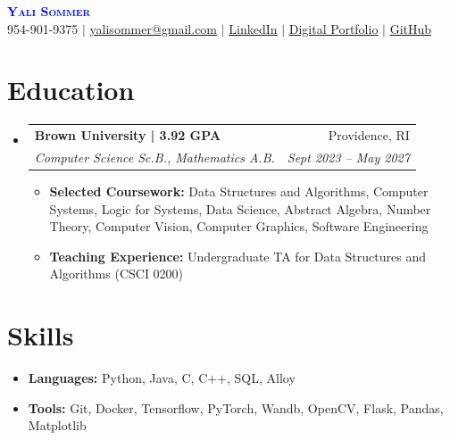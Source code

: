 \documentclass[letterpaper,11pt]{article}
\makeatletter
\newcommand{\resumeItem}[1]{
  \item\small{
    {#1 \vspace{-4pt}}
  }
}
\newcommand{\resumeSubheading}[4]{
  \vspace{-2pt}\item
    \begin{tabular*}{0.97\textwidth}[t]{l@{\extracolsep{\fill}}r}
      \textbf{#1} & #2 \\
      \textit{\small#3} & \textit{\small #4} \\
    \end{tabular*}\vspace{-7pt}
}
\newcommand{\resumeSubHeadingListStart}{\begin{itemize}[leftmargin=0.15in, label={}]}
\newcommand{\resumeSubHeadingListEnd}{\end{itemize}}
\makeatother
\begin{document}

\begin{center}
    \textbf{\Huge \scshape \textcolor{blue}{Yali Sommer}} \\ \vspace{1pt}
    \small 954-901-9375 $|$ \href{mailto:yalisommer@gmail.com}{\underline{yalisommer@gmail.com}} $|$ 
    \href{https://www.linkedin.com/in/yalisommer/}{\underline{LinkedIn}} $|$
    \href{https://yalisommer.github.io/portfolio/#/}{\underline{Digital Portfolio}} $|$
    \href{https://github.com/yalisommer}
    {\underline{GitHub}} 
\end{center}


\section{Education}
  \resumeSubHeadingListStart
    \resumeSubheading
      {Brown University | 3.92 GPA}{Providence, RI}
      {Computer Science Sc.B., Mathematics A.B.}{Sept 2023 -- May 2027}
      \resumeSubHeadingListStart
        \resumeItem{\textbf{Selected Coursework:} Data Structures and Algorithms, Computer Systems, Logic for Systems, Data Science, Abstract Algebra, Number Theory, Computer Vision, Computer Graphics, Software Engineering}
        \resumeItem{\textbf{Teaching Experience:}  Undergraduate TA for Data Structures and Algorithms (CSCI 0200)}
        
      \resumeSubHeadingListEnd
  \resumeSubHeadingListEnd

\section{Skills}
  \resumeSubHeadingListStart
    \resumeItem{\textbf{Languages:} Python, Java, C, C++, SQL, Alloy} \vspace{-1mm}
    \resumeItem{\textbf{Tools:} Git, Docker, Tensorflow, PyTorch, Wandb, OpenCV, Flask, Pandas, Matplotlib} \vspace{-1mm}
  \resumeSubHeadingListEnd
\end{document}
